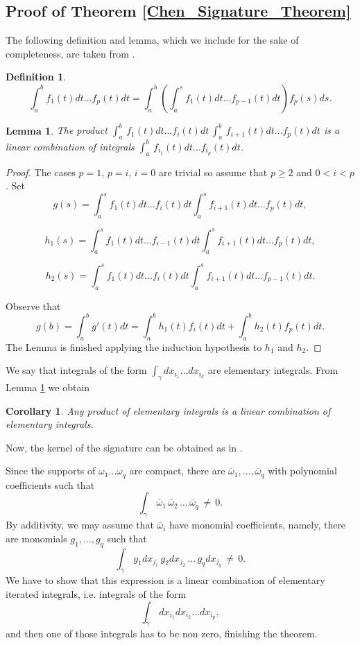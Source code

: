 \documentclass{amsart}
\newtheorem{corollary}[theorem]{Corollary}
\newtheorem{lemma}[theorem]{Lemma}
\newtheorem{definition}[theorem]{Definition}
\begin{document}
\subsection{Proof of Theorem \ref{Chen_Signature_Theorem}}

  The following definition and lemma,  which we include for the sake of completeness,  are taken  from \cite{Chen2}. 


\begin{definition}
\[\int_a^b f_1(t)dt\ldots f_p(t)dt =\int_a^{b} \left(\int_a^{s}  f_1(t)dt\ldots f_{p-1}(t)dt\right) f_p(s) ds.  \]
\end{definition}



\begin{lemma}\label{real}
The product $\int_a^b\, f_1(t)dt\ldots f_i(t)dt\,  \int_a^b\, f_{i+1}(t)dt\ldots f_p(t)dt$ is a linear combination of integrals 
$\int_a^b\, f_{i_1}(t)dt\ldots f_{i_p}(t)dt$.
\end{lemma}

\begin{proof}
The cases $p=1$, $p=i$, $i=0$ are trivial so assume that $p\geq 2$ and $0<i<p$. Set 
\[g(s)=\int_a^s f_1(t)dt\ldots f_i(t)dt  \int_a^s f_{i+1}(t)dt\ldots f_p(t)dt,\]


\[h_1(s)=\int_a^s f_1(t)dt\ldots f_{i-1}(t)dt  \int_a^s f_{i+1}(t)dt\ldots f_p(t)dt,\]


\[h_2(s)=\int_a^s f_1(t)dt\ldots f_i(t)dt  \int_a^s f_{i+1}(t)dt\ldots f_{p-1}(t)dt.\]


Observe that
\[g(b)=\int_a^b g'(t)dt= \int_a^b h_1(t) f_i(t)dt  +   \int_a^b h_2(t) f_p(t)dt. \]
The Lemma is finished applying the induction hypothesis to $h_1$ and $h_2$.
\end{proof}

We say that integrals of the form   $\int_{\gamma}dx_{i_1}\ldots dx_{i_k}$ are elementary integrals.  From Lemma \ref{real} we obtain 
\begin{corollary}\label{elementary}
Any product of elementary integrals is a linear combination of elementary integrals.
\end{corollary}

Now, the kernel of the signature can be obtained as in \cite{Chen2}. 

Since the supports of $\omega_1\ldots\omega_q$ are compact, there are  $\overline\omega_1,\ldots,\overline\omega_q$ with polynomial coefficients such that 
\[  \int_{\gamma}\,  \overline\omega_{1}\,  \overline\omega_2\, \ldots \, \overline\omega_q\,\neq\, 0.\]
By additivity, we may assume that $\overline\omega_i$ have monomial coefficients, namely, there are monomials  $g_1,\ldots, g_q$  such that 
\[  \int_{\gamma}\,  g_{1}dx_{j_1}\,  g_2 dx_{j_2}\, \ldots\,  g_q dx_{j_q}\,\neq\, 0.\]
We have to show that this expression is a linear combination of elementary iterated integrals, i.e. integrals of the form
\[  \int_{\gamma}\,  dx_{i_1}  dx_{i_2} \ldots  dx_{i_p}, \]
and then one of those integrals has to be non zero, finishing the theorem. 
\end{document}
